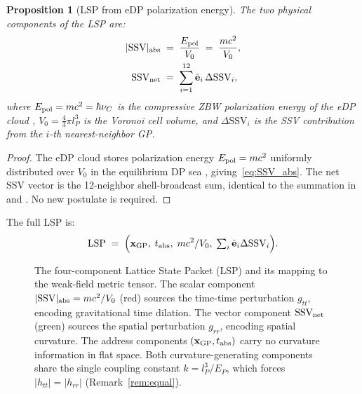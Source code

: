 \documentclass[12pt]{article}
\newtheorem{proposition}[theorem]{Proposition}
\newcommand{\lP}{l_P}
\newcommand{\EP}{E_P}
\newcommand{\SSV}{\text{SSV}}
\newcommand{\LSP}{\text{LSP}}
\begin{document}
\begin{proposition}[LSP from eDP polarization energy]
\label{prop:LSP}
The two physical components of the LSP are:
\begin{align}
  |\SSV|_{\rm abs} &\;=\; \frac{E_{\rm pol}}{V_0}
  \;=\; \frac{mc^2}{V_0},
  \label{eq:SSV_abs}\\
  \mathbf{\SSV}_{\rm net} &\;=\; \sum_{i=1}^{12}
  \hat{\mathbf{e}}_i\,\Delta\SSV_i,
  \label{eq:SSV_net}
\end{align}
where $E_{\rm pol} = mc^2 = \hbar\nu_C$ is the compressive ZBW
polarization energy of the eDP cloud \citep[Proposition~4.1]{abshier2026mass},
$V_0 = \frac{4}{3}\pi\lP^3$ is the Voronoi cell volume, and
$\Delta\SSV_i$ is the SSV contribution from the $i$-th nearest-neighbor
GP.
\end{proposition}

\begin{proof}
The eDP cloud stores polarization energy $E_{\rm pol} = mc^2$ uniformly
distributed over $V_0$ in the equilibrium DP sea
\citep[{\S}2.4]{abshier2026stiff}, giving~\eqref{eq:SSV_abs}.
The net SSV vector is the 12-neighbor shell-broadcast sum, identical
to the summation in \citet{abshier2026grav} and \citet{abshier2026stiff}.
No new postulate is required.
\end{proof}

The full LSP is:
\begin{equation}
  \LSP \;=\; \Bigl(\mathbf{x}_{\rm GP},\; t_{\rm abs},\;
  mc^2/V_0,\; {\textstyle\sum_i}\,\hat{\mathbf{e}}_i\Delta\SSV_i\Bigr).
  \label{eq:LSP_explicit}
\end{equation}

\begin{figure}[H]
  \centering
  
  \caption{The four-component Lattice State Packet (LSP) and its
  mapping to the weak-field metric tensor.
  The scalar component $|\SSV|_{\rm abs} = mc^2/V_0$ (red) sources
  the time-time perturbation $g_{tt}$, encoding gravitational time
  dilation. The vector component $\mathbf{\SSV}_{\rm net}$ (green)
  sources the spatial perturbation $g_{rr}$, encoding spatial
  curvature. The address components
  $(\mathbf{x}_{\rm GP}, t_{\rm abs})$ carry no curvature information
  in flat space. Both curvature-generating components share the single
  coupling constant $k = \lP^3/\EP$, which forces
  $|h_{tt}| = |h_{rr}|$ (Remark~\ref{rem:equal}).}
  \label{fig:lsp_metric}
\end{figure}
\end{document}
